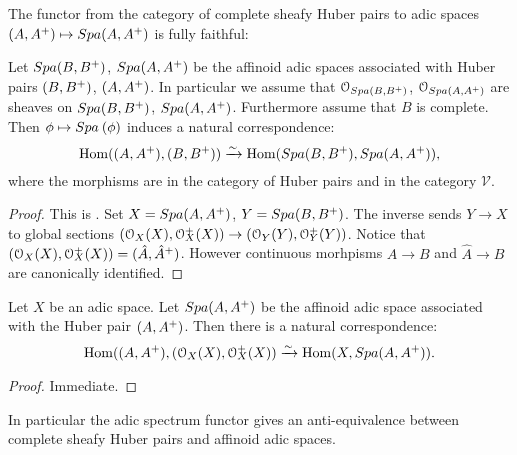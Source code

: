 The functor from the category of complete sheafy Huber pairs to adic spaces $(A,A{^{+}})\mapsto{Spa({A},{A{^{+}}})}$ is fully faithful:

\begin{prop}
Let ${Spa({B},{B{^{+}}})}$, ${Spa({A},{A{^{+}}})}$ be the affinoid adic spaces associated with Huber pairs $(B,B{^{+}})$, $(A, A{^{+}})$. 
In particular we assume that $\mathcal{O}_{{Spa({B},{B{^{+}}})}}$, $\mathcal{O}_{{Spa({A},{A{^{+}}})}}$ are sheaves on ${Spa({B},{B{^{+}}})}$, ${Spa({A},{A{^{+}}})}$. 
Furthermore assume that $B$ is complete.
Then $\phi\mapsto {Spa{\:(\phi)}}$ induces a natural correspondence:
\[{\rm{Hom}}((A, A{^{+}}),(B, B{^{+}}))\xrightarrow{\sim}{\rm{Hom}}({Spa({B},{B{^{+}}})},{Spa({A},{A{^{+}}})}),\]
where the morphisms are in the category of Huber pairs and in the category $\mathcal{V}$.
\end{prop}
\begin{proof}
This is \cite[proposition 2.1]{Huber94}. Set $X = {Spa({A},{A{^{+}}})}$, $Y = {Spa({B},{B{^{+}}})}$. The inverse sends $Y\to X$ to global sections
$(\Oo_X(X),\Oo\upplus\!\!\!\!_X(X))\to(\Oo_Y(Y),\Oo\upplus\!\!\!\!_Y(Y))$. 
Notice that $(\mathcal{O}_X(X),\mathcal{O}{^{+}}\!\!\!\!_X(X))=(\hat{A}, \hat{A}{^{+}})$. However continuous morhpisms $A\to B$ and $\hat{A}\to B$ are canonically identified.
\end{proof}

\begin{cor}\label{cor1}
Let $X$ be an adic space. Let ${Spa({A},{A{^{+}}})}$ be the affinoid adic space associated with the Huber pair $(A, A{^{+}})$. Then there is a natural correspondence:
\[{\rm{Hom}}((A, A{^{+}}),(\mathcal{O}_{X}(X),\mathcal{O}{^{+}}\!\!\!\!_X(X))\xrightarrow{\sim}{\rm{Hom}}(X,{Spa({A},{A{^{+}}})}).\]
\end{cor}
\begin{proof}
Immediate.
\end{proof}
In particular the adic spectrum functor gives an anti-equivalence between complete sheafy Huber pairs and affinoid adic spaces.




















